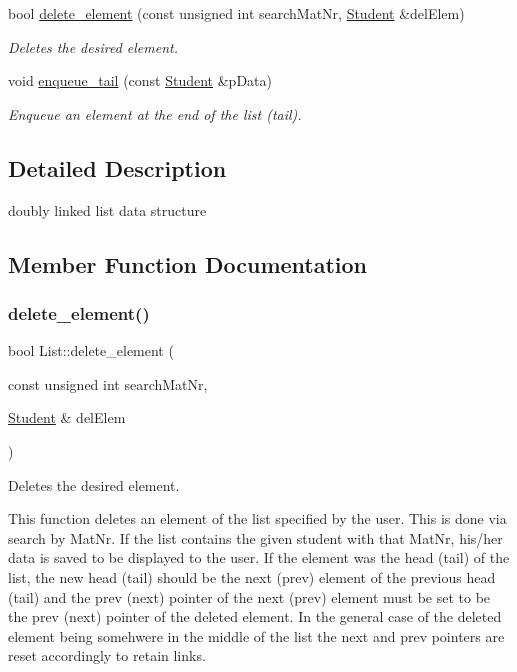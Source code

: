 \begin{DoxyCompactItemize}
bool \hyperlink{class_list_a37928cff7cfcab52b6f86b06b2c58cd1}{delete\+\_\+element} (const unsigned int search\+Mat\+Nr, \hyperlink{class_student}{Student} \&del\+Elem)
\begin{DoxyCompactList}\small\item\em Deletes the desired element. \end{DoxyCompactList}\item 
void \hyperlink{class_list_a8d121a27df3b8984d0ac7edc87d14af5}{enqueue\+\_\+tail} (const \hyperlink{class_student}{Student} \&p\+Data)
\begin{DoxyCompactList}\small\item\em Enqueue an element at the end of the list (tail). \end{DoxyCompactList}\end{DoxyCompactItemize}


\subsection{Detailed Description}
doubly linked list data structure 

\subsection{Member Function Documentation}
\mbox{\label{class_list_a37928cff7cfcab52b6f86b06b2c58cd1}} 
\subsubsection{\texorpdfstring{delete\+\_\+element()}{delete\_element()}}
{\footnotesize\ttfamily bool List\+::delete\+\_\+element (\begin{DoxyParamCaption}\item[{const unsigned int}]{search\+Mat\+Nr,  }\item[{\hyperlink{class_student}{Student} \&}]{del\+Elem }\end{DoxyParamCaption})}



Deletes the desired element. 

This function deletes an element of the list specified by the user. This is done via search by Mat\+Nr. If the list contains the given student with that Mat\+Nr, his/her data is saved to be displayed to the user. If the element was the head (tail) of the list, the new head (tail) should be the next (prev) element of the previous head (tail) and the prev (next) pointer of the next (prev) element must be set to be the prev (next) pointer of the deleted element. In the general case of the deleted element being somehwere in the middle of the list the next and prev pointers are reset accordingly to retain links.

